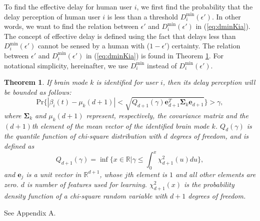 \documentclass[journal,draftclsnofoot,onecolumn,12pt]{IEEEtran}%
\newtheorem{theorem}{\bf Theorem}
\newcommand{\Sigmab}{\boldsymbol{\Sigma}}
\begin{document}
	
	
	
	To  find the effective delay for human user $i$, we first find the probability that the  delay perception of human user $i$ is less than a threshold $D_i^{\min}(\epsilon')$. In other words, we want to find the relation between $\epsilon'$ and $D_i^{\min}(\epsilon')$ in (\ref{eq:dminKia}).  The concept of effective delay is defined using the fact that delays less than $D_i^{\min}(\epsilon')$ cannot be sensed by a human with ($1-\epsilon'$) certainty. The relation between $\epsilon'$ and $D_i^{\min}(\epsilon')$ in (\ref{eq:dminKia}) is found in Theorem \ref{lemma:confidence region single mode}. {For notational simplicity, hereinafter, we use $D_i^{\min}$ instead of $D_i^{\min}(\epsilon')$.}

	
	\begin{theorem}\label{lemma:confidence region single mode}
If brain mode $k$  is identified for user $i$, then its delay perception will be bounded as follows:
	\begin{equation}\label{eq:lemma1 main result}
	\text{Pr}\Big\{|\beta_i(t)-\mu_k(d+1)|<\sqrt{Q_{d+1}(\gamma) \boldsymbol{e}_{d+1}^T\Sigmab_k \boldsymbol{e}_{d+1}}\Big\}>\gamma,
	\end{equation}
   { where $\Sigmab_k$ and $\mu_k(d+1)$ represent, respectively, the covariance matrix  and the $(d+1)$th element of the mean vector of  the identified brain mode $k$.}
		{$Q_d(\gamma)$ is the quantile function of chi-square distribution with $d$ degrees of freedom,} and is defined as
		\begin{equation}
		Q_{d+1}(\gamma)=\inf\Big\{x\in \mathds{R}| \gamma\leq \int_{0}^{x} \chi_{d+1}^2(u) du\Big\},
		\end{equation}
		and	$\boldsymbol{e}_j$ is a unit vector in $\mathds{R}^{d+1}$, whose $j$th element is $1$ and all other elements are zero. $d$ is number of features  used for learning. $\chi_{d+1}^2(x)$ is the probability density function of a chi-square random variable with $d+1$ degrees of freedom. 
	\end{theorem}
\begin{IEEEproof}
	See Appendix A.
\end{IEEEproof}
\end{document}
